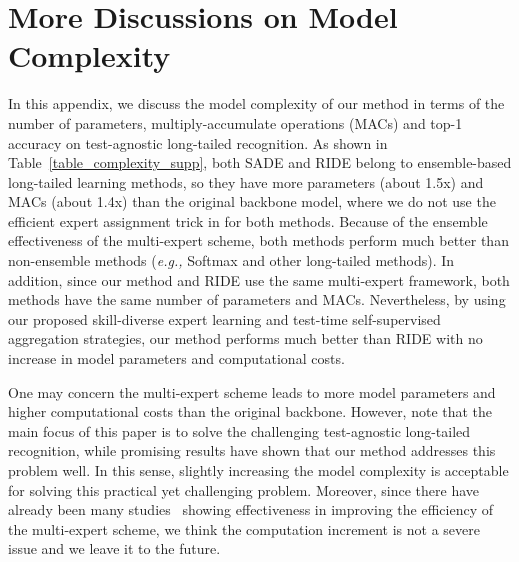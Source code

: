 \documentclass{article}
\def\eg{\emph{e.g.}} \def\Eg{\emph{E.g.}}
\def\eg{\emph{e.g., }}
\begin{document}
\clearpage


 


\section{More Discussions on Model Complexity}\label{App_G}

In this appendix, we  discuss the model complexity of our method in terms of the number of parameters, multiply-accumulate operations (MACs) and    top-1 accuracy on test-agnostic long-tailed recognition. 
As shown in Table~\ref{table_complexity_supp}, 
both SADE and RIDE belong to ensemble-based long-tailed learning methods, so they have more parameters (about 1.5x) and MACs (about 1.4x) than the original backbone model, where we do not use the efficient expert assignment trick in \cite{wang2020long} for both methods. Because of the ensemble effectiveness of the multi-expert scheme, both methods perform much better than non-ensemble methods (\eg Softmax and other long-tailed methods). 
In addition, since our method and RIDE use the same multi-expert framework, both  methods have the same number of parameters and MACs. Nevertheless, by using our proposed   skill-diverse expert learning and test-time self-supervised aggregation strategies, our method performs much better than RIDE with no increase in model parameters and computational costs.  

One may concern   the multi-expert scheme leads to more model parameters and higher  computational costs than the original backbone. However,  note that the main focus of this paper is to solve the challenging  test-agnostic long-tailed recognition, while   promising results have shown that our method addresses this problem well. In this sense, slightly increasing the model complexity is acceptable  for solving this practical yet challenging  problem. Moreover, since there have already been many  studies~\cite{havasi2020training,wen2019batchensemble} showing effectiveness in improving the efficiency of the multi-expert  scheme, we think the computation increment  is not a   severe issue and we leave it to the  future. 
 
\end{document}
